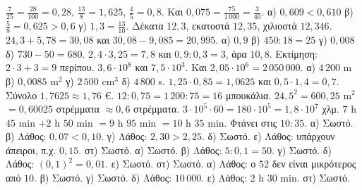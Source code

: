  $\frac{7}{25}=\frac{28}{100}=0{,}28$, $\frac{13}{8}=1{,}625$, $\frac{4}{5}=0{,}8$. Και $0{,}075=\frac{75}{1\,000}=\frac{3}{40}$.
 α) $0{,}609<0{,}610$ \quad β) $\frac{5}{8}=0{,}625>0{,}6$ \quad γ) $1{,}3=\frac{13}{10}$.
 Δέκατα $12{,}3$, εκατοστά $12{,}35$, χιλιοστά $12{,}346$.
 $24{,}3+5{,}78=30{,}08$ και $30{,}08-9{,}085=20{,}995$.
 α) $0{,}9$ \quad β) $450:18=25$ \quad γ) $0{,}008$ \quad δ) $730-50=680$.
 $2{,}4\cdot3{,}25=7{,}8$ και $0{,}9:0{,}3=3$, άρα $10{,}8$. Εκτίμηση: $2\cdot3+3=9$ περίπου.
 $3{,}6\cdot10^8$ και $7{,}5\cdot10^3$. Και $2{,}05\cdot10^6=2\,050\,000$.
 α) $4\,200$ m \quad β) $0{,}0085$ m$^2$ \quad γ) $2\,500$ cm$^3$ \quad δ) $4\,800$ s.
 $1{,}25\cdot0{,}85=1{,}0625$ και $0{,}5\cdot1{,}4=0{,}7$. Σύνολο $1{,}7625\approx1{,}76$ €.
 $12:0{,}75=1\,200:75=16$ μπουκάλια.
 $24{,}5^2=600{,}25$ m$^2$ $=0{,}60025$ στρέμματα $\approx0{,}6$ στρέμματα.
 $3\cdot10^5\cdot60=180\cdot10^5=1{,}8\cdot10^7$ χλμ.
 $7$ h $45$ min $+2$ h $50$ min $=9$ h $95$ min $=10$ h $35$ min. Φτάνει στις $10{:}35$.
 α) Σωστό. β) Λάθος: $0{,}07<0{,}10$. γ) Λάθος: $2{,}30>2{,}25$. δ) Σωστό. ε) Λάθος: υπάρχουν άπειροι, π.χ. $0{,}15$. στ) Σωστό.
 α) Σωστό. β) Λάθος: $5:0{,}1=50$. γ) Σωστό. δ) Λάθος: $(0{,}1)^2=0{,}01$. ε) Σωστό. στ) Σωστό.
 α) Λάθος: ο $52$ δεν είναι μικρότερος από $10$. β) Σωστό. γ) Σωστό. δ) Λάθος: $10\,000$. ε) Λάθος: $2$ h $30$ min. στ) Σωστό.
